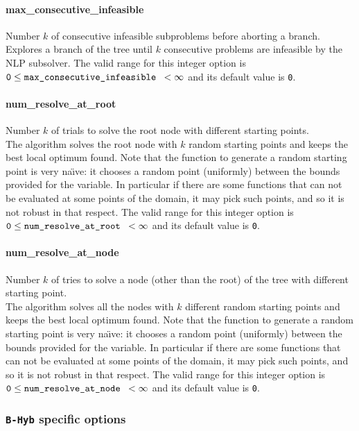 \paragraph{max\_consecutive\_infeasible}
Number $k$ of consecutive infeasible subproblems before aborting a branch. \\
 Explores a branch of the tree until $k$ consecutive
problems are infeasible by the NLP subsolver. The valid range for
this integer option is
${\tt 0} \le \hbox{\tt max\_consecutive\_infeasible } <  \infty$
and its default value is {\tt 0}.

\paragraph{num\_resolve\_at\_root}
Number $k$ of trials to solve the root node with different starting points. \\
 The algorithm solves the root node with $k$ random starting points and keeps the best local optimum found.
Note that the function to generate a random starting point is very na\"{\i}ve: it chooses a random point (uniformly) between the bounds provided for the variable.
In particular if there are some functions that can not be evaluated at some points of the domain, it may pick such points, and so it is not robust in that respect.
The valid range for this integer option is
${\tt 0} \le \hbox{\tt num\_resolve\_at\_root } <  \infty $
and its default value is {\tt 0}.

\paragraph{num\_resolve\_at\_node}
Number $k$ of tries to solve a node (other than the root) of the tree with different starting point. \\
 The algorithm solves all the nodes with $k$ different random starting points and keeps the best local optimum found.
Note that the function to generate a random starting point is very na\"{\i}ve: it chooses a random point (uniformly) between the bounds provided for the variable.
In particular if there are some functions that can not be evaluated at some points of the domain, it may pick such points, and so it is not robust in that respect.
The valid range for this integer option is
${\tt 0} \le \hbox{\tt num\_resolve\_at\_node } <  \infty$
and its default value is {\tt 0}.



\subsubsection{\texttt{B-Hyb} specific options}

